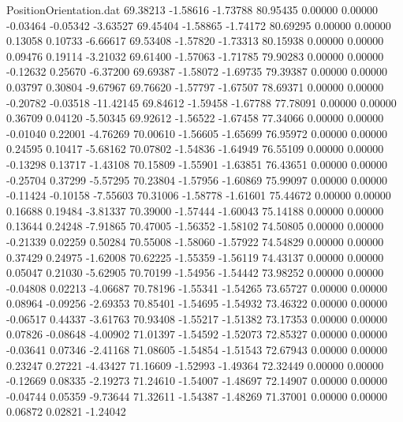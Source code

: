 \begin{filecontents}{PositionOrientation.dat}
  69.38213   -1.58616   -1.73788    80.95435    0.00000    0.00000   -0.03464   -0.05342   -3.63527
  69.45404   -1.58865   -1.74172    80.69295    0.00000    0.00000    0.13058    0.10733   -6.66617
  69.53408   -1.57820   -1.73313    80.15938    0.00000    0.00000    0.09476    0.19114   -3.21032
  69.61400   -1.57063   -1.71785    79.90283    0.00000    0.00000   -0.12632    0.25670   -6.37200
  69.69387   -1.58072   -1.69735    79.39387    0.00000    0.00000    0.03797    0.30804   -9.67967
  69.76620   -1.57797   -1.67507    78.69371    0.00000    0.00000   -0.20782   -0.03518  -11.42145
  69.84612   -1.59458   -1.67788    77.78091    0.00000    0.00000    0.36709    0.04120   -5.50345
  69.92612   -1.56522   -1.67458    77.34066    0.00000    0.00000   -0.01040    0.22001   -4.76269
  70.00610   -1.56605   -1.65699    76.95972    0.00000    0.00000    0.24595    0.10417   -5.68162
  70.07802   -1.54836   -1.64949    76.55109    0.00000    0.00000   -0.13298    0.13717   -1.43108
  70.15809   -1.55901   -1.63851    76.43651    0.00000    0.00000   -0.25704    0.37299   -5.57295
  70.23804   -1.57956   -1.60869    75.99097    0.00000    0.00000   -0.11424   -0.10158   -7.55603
  70.31006   -1.58778   -1.61601    75.44672    0.00000    0.00000    0.16688    0.19484   -3.81337
  70.39000   -1.57444   -1.60043    75.14188    0.00000    0.00000    0.13644    0.24248   -7.91865
  70.47005   -1.56352   -1.58102    74.50805    0.00000    0.00000   -0.21339    0.02259    0.50284
  70.55008   -1.58060   -1.57922    74.54829    0.00000    0.00000    0.37429    0.24975   -1.62008
  70.62225   -1.55359   -1.56119    74.43137    0.00000    0.00000    0.05047    0.21030   -5.62905
  70.70199   -1.54956   -1.54442    73.98252    0.00000    0.00000   -0.04808    0.02213   -4.06687
  70.78196   -1.55341   -1.54265    73.65727    0.00000    0.00000    0.08964   -0.09256   -2.69353
  70.85401   -1.54695   -1.54932    73.46322    0.00000    0.00000   -0.06517    0.44337   -3.61763
  70.93408   -1.55217   -1.51382    73.17353    0.00000    0.00000    0.07826   -0.08648   -4.00902
  71.01397   -1.54592   -1.52073    72.85327    0.00000    0.00000   -0.03641    0.07346   -2.41168
  71.08605   -1.54854   -1.51543    72.67943    0.00000    0.00000    0.23247    0.27221   -4.43427
  71.16609   -1.52993   -1.49364    72.32449    0.00000    0.00000   -0.12669    0.08335   -2.19273
  71.24610   -1.54007   -1.48697    72.14907    0.00000    0.00000   -0.04744    0.05359   -9.73644
  71.32611   -1.54387   -1.48269    71.37001    0.00000    0.00000    0.06872    0.02821   -1.24042

\end{filecontents}
